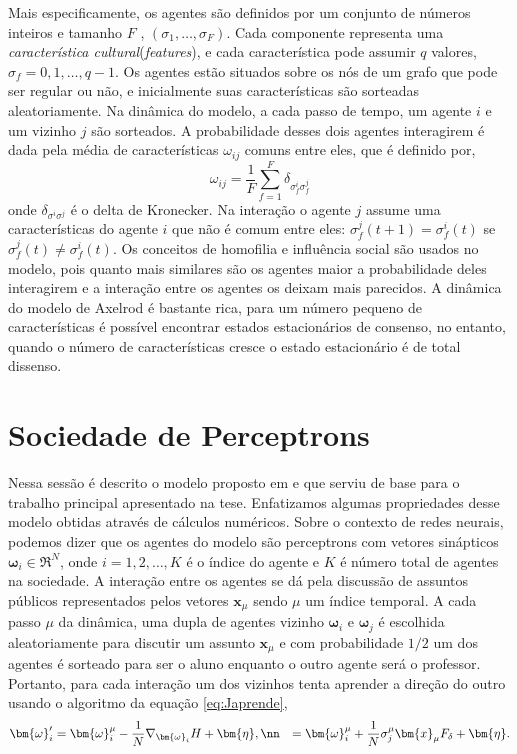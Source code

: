 Mais especificamente, os agentes são definidos por um conjunto de números
inteiros e tamanho $F$  , $(\sigma_1,\ldots,\sigma_F)$. Cada componente
representa uma \textit{característica cultural}(\textit{features}), e cada
característica pode assumir $q$ valores, $\sigma_f = 0,1,\ldots,q-1$. Os
agentes estão situados sobre os nós de um grafo que pode ser regular
ou não, e inicialmente suas características são sorteadas aleatoriamente. Na
dinâmica do modelo, a cada passo de tempo, um agente $i$ e um vizinho $j$ são
sorteados. A probabilidade desses dois agentes interagirem é dada pela média
de características $\omega_{ij}$ comuns entre eles, que é definido por,
\[
\omega_{ij} = \frac{1}{F} \sum_{f=1}^F \delta_{\sigma_f^i\sigma_f^j}
\]
onde $\delta_{\sigma^i\sigma^j}$ é o delta de Kronecker.  Na interação o
agente $j$ assume uma características do agente $i$ que não é comum entre
eles: $\sigma_f^j(t+1)=\sigma_f^i(t)$ se $\sigma_f^j(t)\neq\sigma_f^i(t)$. Os
conceitos de homofilia e influência social são usados no modelo, pois quanto
mais similares são os agentes maior a probabilidade deles interagirem e a
interação entre os agentes os deixam mais parecidos. A dinâmica do modelo
de Axelrod é bastante rica, para um número pequeno de características é
possível encontrar estados estacionários de consenso, no entanto, quando o
número de características cresce o estado estacionário é de total dissenso.

\section{Sociedade de Perceptrons} %
\label{sec:plandia}

Nessa sessão é descrito o modelo proposto em \citep{Caticha2011a} e que
serviu de base para o trabalho principal apresentado na tese. Enfatizamos
algumas propriedades desse modelo obtidas através de cálculos
numéricos. Sobre o contexto de redes neurais, podemos dizer que os agentes
do modelo são perceptrons com vetores sinápticos $\bm{\omega}_i \in \Re^N
$, onde $i=1, 2,\ldots,K$  é o índice do agente e $K$ é número total de
agentes na sociedade. A interação entre os agentes se dá pela discussão
de assuntos públicos representados pelos vetores $\bm{x}_\mu$ sendo $\mu$
um índice temporal. A cada passo $\mu$ da dinâmica, uma dupla de agentes
vizinho $\bm{\omega}_i$ e $\bm{\omega}_j$ é escolhida aleatoriamente para
discutir um assunto $\bm{x}_\mu$ e com probabilidade $1/2$ um dos agentes é
sorteado para ser o aluno enquanto o outro agente será o professor. Portanto,
para cada interação um dos vizinhos tenta aprender a direção do outro
usando o algoritmo da equação \eqref{eq:Japrende},
\begin{align}
    \bm{\omega}_i^\prime&= \bm{\omega}_i^\mu - 
        \frac{1}{N}\nabla_{\bm{\omega}_i} H +\bm{\eta}, \nn
    &= \bm{\omega}_i^\mu + \frac{1}{N}\sigma_j^\mu\bm{x}_\mu F_\delta
        + \bm{\eta}.
\label{eq:Japrende}
\end{align} 

